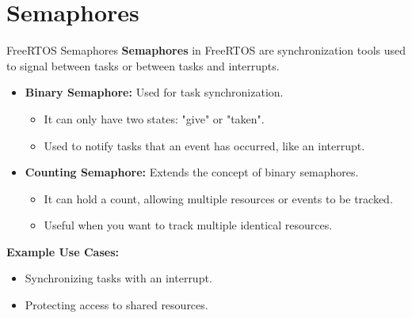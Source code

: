 \documentclass[10pt]{beamer}
\begin{document}
\section{Semaphores}

\begin{frame}{FreeRTOS Semaphores}
    \textbf{Semaphores} in FreeRTOS are synchronization tools used to signal between tasks or between tasks and interrupts.
    
    \begin{itemize}
        \item \textbf{Binary Semaphore:} Used for task synchronization.
        \begin{itemize}
            \item It can only have two states: "give" or "taken".
            \item Used to notify tasks that an event has occurred, like an interrupt.
        \end{itemize}
        
        \item \textbf{Counting Semaphore:} Extends the concept of binary semaphores.
        \begin{itemize}
            \item It can hold a count, allowing multiple resources or events to be tracked.
            \item Useful when you want to track multiple identical resources.
        \end{itemize}
\end{itemize}

\textbf{Example Use Cases:}
\begin{itemize}
    \item Synchronizing tasks with an interrupt.
    \item Protecting access to shared resources.
\end{itemize}
\end{frame}
\end{document}
